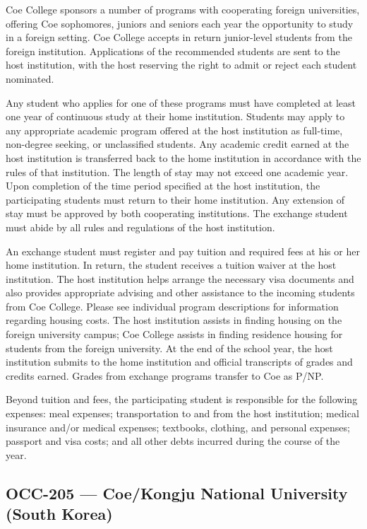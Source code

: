 \documentclass[
  letterpaper,
]{scrbook}
\begin{document}
Coe College sponsors a number of programs with cooperating foreign
universities, offering Coe sophomores, juniors and seniors each year the
opportunity to study in a foreign setting. Coe College accepts in return
junior-level students from the foreign institution. Applications of the
recommended students are sent to the host institution, with the host
reserving the right to admit or reject each student nominated.

Any student who applies for one of these programs must have completed at
least one year of continuous study at their home institution. Students
may apply to any appropriate academic program offered at the host
institution as full-time, non-degree seeking, or unclassified students.
Any academic credit earned at the host institution is transferred back
to the home institution in accordance with the rules of that
institution. The length of stay may not exceed one academic year. Upon
completion of the time period specified at the host institution, the
participating students must return to their home institution. Any
extension of stay must be approved by both cooperating institutions. The
exchange student must abide by all rules and regulations of the host
institution.

An exchange student must register and pay tuition and required fees at
his or her home institution. In return, the student receives a tuition
waiver at the host institution. The host institution helps arrange the
necessary visa documents and also provides appropriate advising and
other assistance to the incoming students from Coe College. Please see
individual program descriptions for information regarding housing costs.
The host institution assists in finding housing on the foreign
university campus; Coe College assists in finding residence housing for
students from the foreign university. At the end of the school year, the
host institution submits to the home institution and official
transcripts of grades and credits earned. Grades from exchange programs
transfer to Coe as P/NP.

Beyond tuition and fees, the participating student is responsible for
the following expenses: meal expenses; transportation to and from the
host institution; medical insurance and/or medical expenses; textbooks,
clothing, and personal expenses; passport and visa costs; and all other
debts incurred during the course of the year.

\subsection{OCC-205 --- Coe/Kongju National University (South
Korea)}\label{occ-205-coekongju-national-university-south-korea}
\end{document}
